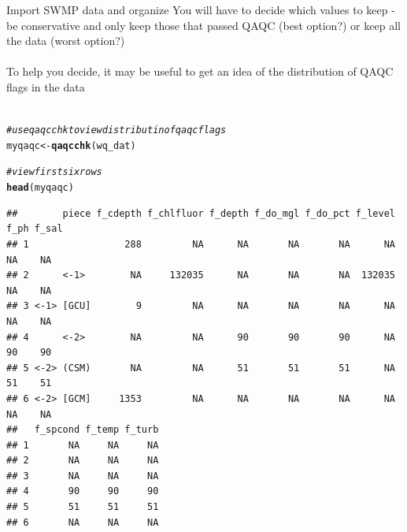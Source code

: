 \documentclass[xcolor=svgnames]{beamer}\usepackage[]{graphicx}\usepackage[]{color}
\makeatletter
\newcommand{\hlcom}[1]{\textcolor[rgb]{0.678,0.584,0.686}{\textit{#1}}}%
\newcommand{\hlstd}[1]{\textcolor[rgb]{0.345,0.345,0.345}{#1}}%
\newcommand{\hlkwb}[1]{\textcolor[rgb]{0.69,0.353,0.396}{#1}}%
\newcommand{\hlkwd}[1]{\textcolor[rgb]{0.737,0.353,0.396}{\textbf{#1}}}%
\newenvironment{kframe}{%
 \def\at@end@of@kframe{}%
 \ifinner\ifhmode%
  \def\at@end@of@kframe{\end{minipage}}%
  \begin{minipage}{\columnwidth}%
 \fi\fi%
 \def\FrameCommand##1{\hskip\@totalleftmargin \hskip-\fboxsep
 \colorbox{shadecolor}{##1}\hskip-\fboxsep
     \hskip-\linewidth \hskip-\@totalleftmargin \hskip\columnwidth}%
 \MakeFramed {\advance\hsize-\width
   \@totalleftmargin\z@ \linewidth\hsize
   \@setminipage}}%
 {\par\unskip\endMakeFramed%
 \at@end@of@kframe}
\newenvironment{knitrout}{}{} %
\newcommand{\Bigtxt}[1]{\textbf{\textit{#1}}}
\makeatother
\begin{document}
\begin{frame}[fragile]{Import SWMP data and organize}
You will have to decide which values to keep - be conservative and only keep those that passed QAQC (best option?) or keep all the data (worst option?) \\~\\
To help you decide, it may be useful to get an idea of the distribution of QAQC flags in the data\\~\\
\begin{knitrout}\scriptsize
{}\color{fgcolor}\begin{kframe}
\begin{alltt}
\hlcom{# use qaqcchk to view distributin of qaqc flags}
\hlstd{myqaqc} \hlkwb{<-} \hlkwd{qaqcchk}\hlstd{(wq_dat)}

\hlcom{# view first six rows}
\hlkwd{head}\hlstd{(myqaqc)}
\end{alltt}
\begin{verbatim}
##        piece f_cdepth f_chlfluor f_depth f_do_mgl f_do_pct f_level f_ph f_sal
## 1                 288         NA      NA       NA       NA      NA   NA    NA
## 2      <-1>        NA     132035      NA       NA       NA  132035   NA    NA
## 3 <-1> [GCU]        9         NA      NA       NA       NA      NA   NA    NA
## 4      <-2>        NA         NA      90       90       90      NA   90    90
## 5 <-2> (CSM)       NA         NA      51       51       51      NA   51    51
## 6 <-2> [GCM]     1353         NA      NA       NA       NA      NA   NA    NA
##   f_spcond f_temp f_turb
## 1       NA     NA     NA
## 2       NA     NA     NA
## 3       NA     NA     NA
## 4       90     90     90
## 5       51     51     51
## 6       NA     NA     NA
\end{verbatim}
\end{kframe}
\end{knitrout}
\end{frame}

\end{document}
